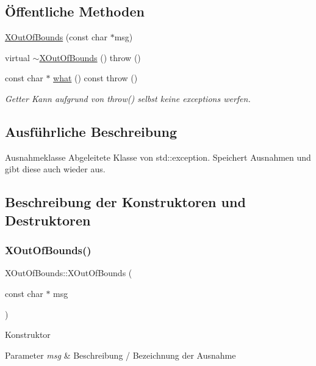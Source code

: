 \subsection*{Öffentliche Methoden}
\begin{DoxyCompactItemize}
\item 
\hyperlink{class_x_out_of_bounds_a9e2fc4dfa3f25d730563ff2492f40662}{X\+Out\+Of\+Bounds} (const char $\ast$msg)
\item 
virtual \hyperlink{class_x_out_of_bounds_a7655380482ddb2f03570caee39fa2748}{$\sim$\+X\+Out\+Of\+Bounds} ()  throw ()
\item 
const char $\ast$ \hyperlink{class_x_out_of_bounds_a5a047c4fa3db7ef57de7732ae4a2e937}{what} () const  throw ()
\begin{DoxyCompactList}\small\item\em Getter Kann aufgrund von throw() selbst keine exceptions werfen. \end{DoxyCompactList}\end{DoxyCompactItemize}


\subsection{Ausführliche Beschreibung}
Ausnahmeklasse Abgeleitete Klasse von std\+::exception. Speichert Ausnahmen und gibt diese auch wieder aus. 

\subsection{Beschreibung der Konstruktoren und Destruktoren}
\mbox{\label{class_x_out_of_bounds_a9e2fc4dfa3f25d730563ff2492f40662}} 
\subsubsection{\texorpdfstring{X\+Out\+Of\+Bounds()}{XOutOfBounds()}}
{\footnotesize\ttfamily X\+Out\+Of\+Bounds\+::\+X\+Out\+Of\+Bounds (\begin{DoxyParamCaption}\item[{const char $\ast$}]{msg }\end{DoxyParamCaption})}

Konstruktor 
\begin{DoxyParams}{Parameter}
{\em msg} & Beschreibung / Bezeichnung der Ausnahme \\
\hline
\end{DoxyParams}
\mbox{\label{class_x_out_of_bounds_a7655380482ddb2f03570caee39fa2748}} 
